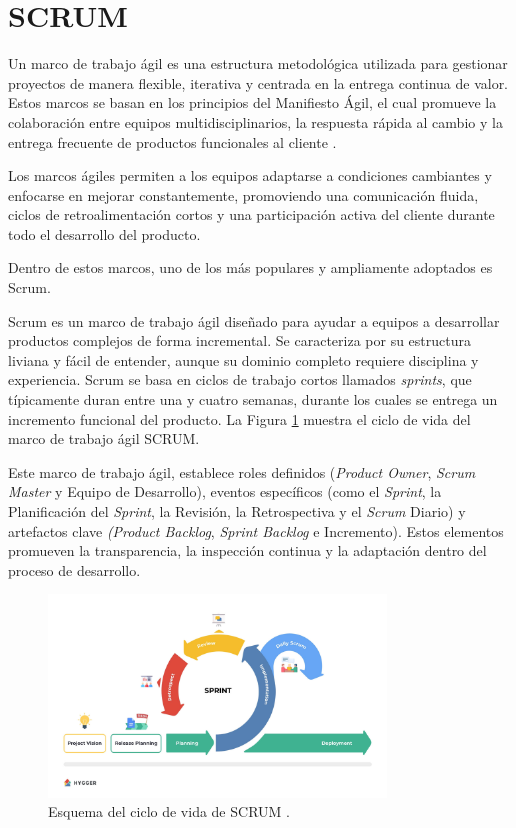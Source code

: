\section{SCRUM}

Un marco de trabajo ágil es una estructura metodológica utilizada para gestionar proyectos de manera flexible, iterativa y centrada en la entrega continua de valor. Estos marcos se basan en los principios del Manifiesto Ágil, el cual promueve la colaboración entre equipos multidisciplinarios, la respuesta rápida al cambio y la entrega frecuente de productos funcionales al cliente \cite{beck2001manifesto}.

Los marcos ágiles permiten a los equipos adaptarse a condiciones cambiantes y enfocarse en mejorar constantemente, promoviendo una comunicación fluida, ciclos de retroalimentación cortos y una participación activa del cliente durante todo el desarrollo del producto.

Dentro de estos marcos, uno de los más populares y ampliamente adoptados es Scrum. 

Scrum es un marco de trabajo ágil diseñado para ayudar a equipos a desarrollar productos complejos de forma incremental. Se caracteriza por su estructura liviana y fácil de entender, aunque su dominio completo requiere disciplina y experiencia. Scrum se basa en ciclos de trabajo cortos llamados \textit{sprints}, que típicamente duran entre una y cuatro semanas, durante los cuales se entrega un incremento funcional del producto. La Figura \ref{fig.SCRUM} muestra el ciclo de vida del marco de trabajo ágil SCRUM.

Este marco de trabajo ágil, establece roles definidos (\textit{Product Owner}, \textit{Scrum Master} y Equipo de Desarrollo), eventos específicos (como el \textit{Sprint}, la Planificación del \textit{Sprint}, la Revisión, la Retrospectiva y el \textit{Scrum} Diario) y artefactos clave \textit{(Product Backlog}, \textit{Sprint Backlog} e Incremento). Estos elementos promueven la transparencia, la inspección continua y la adaptación dentro del proceso de desarrollo.


\begin{figure}[H]
    \centering
    \includegraphics[width=0.8\textwidth]{./img/metodologia/scrum.jpg}
    \caption{Esquema del ciclo de vida de SCRUM \cite{schwaber2020scrum2}.}
    \label{fig.SCRUM}
\end{figure}

